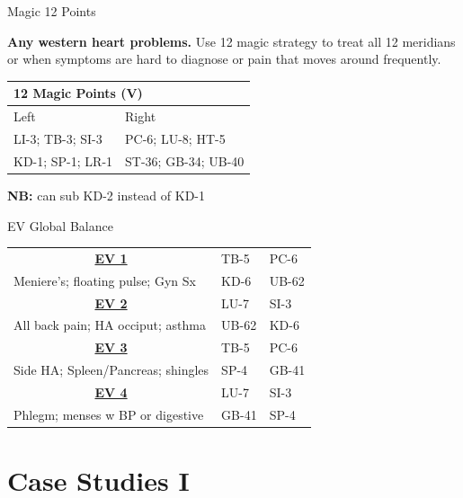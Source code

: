 \begin{frame}{Magic 12 Points}

\textbf{Any western heart problems.} Use 12 magic strategy to treat all 12 meridians or when symptoms are hard to diagnose or pain that moves around frequently. 

\begin{table}[]
\begin{tabular}{@{}ll@{}}
\toprule
\multicolumn{2}{l}{12 Magic Points (V)} \\ \midrule
Left              & Right               \\
LI-3; TB-3; SI-3  & PC-6; LU-8; HT-5    \\
KD-1; SP-1; LR-1  & ST-36; GB-34; UB-40 \\ \bottomrule
\end{tabular}
\end{table}

\textbf{NB:} can sub KD-2 instead of KD-1

\end{frame}

\begin{frame}{EV Global Balance}

\begin{table}[]
\begin{tabular}{@{}l|ll@{}}
\multicolumn{1}{c|}{{\ul \textbf{EV 1}}} & TB-5  & PC-6  \\
Meniere's; floating pulse; Gyn Sx        & KD-6  & UB-62 \\ \midrule
\multicolumn{1}{c|}{{\ul \textbf{EV 2}}} & LU-7  & SI-3  \\
All back pain; HA occiput; asthma        & UB-62 & KD-6  \\ \midrule
\multicolumn{1}{c|}{{\ul \textbf{EV 3}}} & TB-5  & PC-6  \\
Side HA; Spleen/Pancreas; shingles       & SP-4  & GB-41 \\ \midrule
\multicolumn{1}{c|}{{\ul \textbf{EV 4}}} & LU-7  & SI-3  \\
Phlegm; menses w BP or digestive         & GB-41 & SP-4 
\end{tabular}
\end{table}

\end{frame}

\section{Case Studies I}

